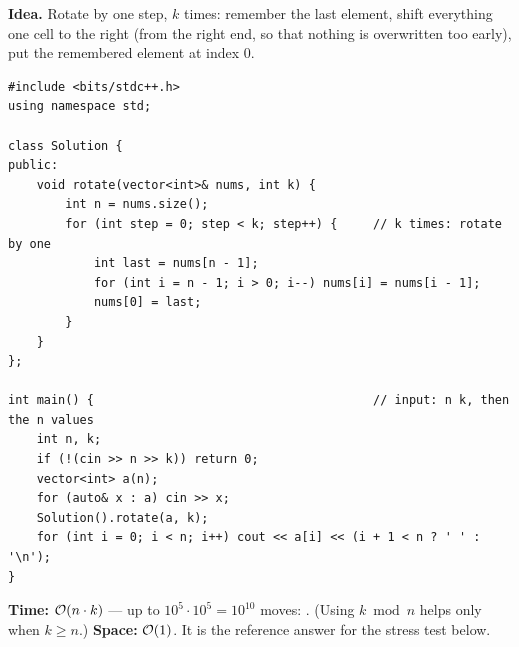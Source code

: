 \begin{bruteforcebox}
\textbf{Idea.} Rotate by one step, $k$ times: remember the last element, shift everything one cell to the right (from the right end, so that nothing is overwritten too early), put the remembered element at index 0.
\begin{lstlisting}[style=cpp]
#include <bits/stdc++.h>
using namespace std;

class Solution {
public:
    void rotate(vector<int>& nums, int k) {
        int n = nums.size();
        for (int step = 0; step < k; step++) {     // k times: rotate by one
            int last = nums[n - 1];
            for (int i = n - 1; i > 0; i--) nums[i] = nums[i - 1];
            nums[0] = last;
        }
    }
};

int main() {                                       // input: n k, then the n values
    int n, k;
    if (!(cin >> n >> k)) return 0;
    vector<int> a(n);
    for (auto& x : a) cin >> x;
    Solution().rotate(a, k);
    for (int i = 0; i < n; i++) cout << a[i] << (i + 1 < n ? ' ' : '\n');
}
\end{lstlisting}
\begin{complexitybox}
\textbf{Time:} $\mathcal{O}(n \cdot k)$ --- up to $10^5 \cdot 10^5 = 10^{10}$ moves: \tle. (Using $k \bmod n$ helps only when $k \ge n$.) \textbf{Space:} $\mathcal{O}(1)$. It is the reference answer for the stress test below.
\end{complexitybox}
\end{bruteforcebox}

